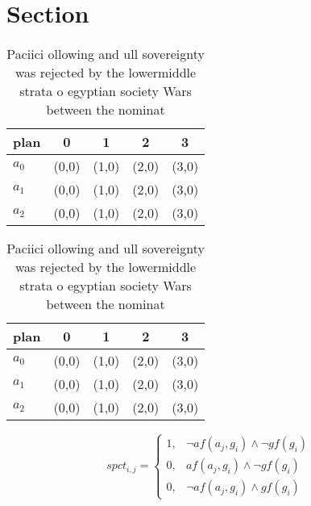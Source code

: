 \documentclass[a4paper]{article}
\begin{document}
\section{Section}

\begin{table}
\begin{adjustbox}{width=0.9\columnwidth}
\begin{tabular}{|l|l|l|l|l|}
\hline
\textbf{plan} & \multicolumn{1}{c|}{\textbf{0}} & \multicolumn{1}{c|}{\textbf{1}} & \multicolumn{1}{c|}{\textbf{2}} & \multicolumn{1}{c|}{\textbf{3}} \\ \hline
\textbf{$a_0$}  & (0,0) & (1,0) & (2,0) & (3,0) \\ \hline
\textbf{$a_1$}  & (0,0) & (1,0) & (2,0) & (3,0) \\ \hline
\textbf{$a_2$}  & (0,0) & (1,0) & (2,0) & (3,0) \\ \hline
\end{tabular}
\end{adjustbox}
\caption{Paciici ollowing and ull sovereignty was rejected by the lowermiddle strata o egyptian society Wars between the nominat
}
\end{table}

\begin{table}
\begin{adjustbox}{width=0.9\columnwidth}
\begin{tabular}{|l|l|l|l|l|}
\hline
\textbf{plan} & \multicolumn{1}{c|}{\textbf{0}} & \multicolumn{1}{c|}{\textbf{1}} & \multicolumn{1}{c|}{\textbf{2}} & \multicolumn{1}{c|}{\textbf{3}} \\ \hline
\textbf{$a_0$}  & (0,0) & (1,0) & (2,0) & (3,0) \\ \hline
\textbf{$a_1$}  & (0,0) & (1,0) & (2,0) & (3,0) \\ \hline
\textbf{$a_2$}  & (0,0) & (1,0) & (2,0) & (3,0) \\ \hline
\end{tabular}
\end{adjustbox}
\caption{Paciici ollowing and ull sovereignty was rejected by the lowermiddle strata o egyptian society Wars between the nominat
}
\end{table}

\begin{equation}
spct_{i,j} =
\begin{cases}
1, & \text{$\neg af(a_j,g_i) \wedge \neg gf(g_i)$}\\
0, & \text{$af(a_j,g_i) \wedge \neg gf(g_i)$}\\
0, & \text{$\neg af(a_j,g_i) \wedge gf(g_i)$}
\end{cases}
\end{equation}
\end{document}
